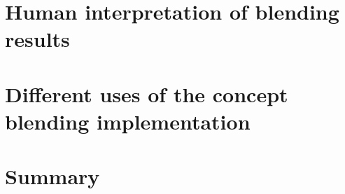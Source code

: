 



\section{Human interpretation of blending results}


\section{Different uses of the concept blending implementation}




\section{Summary}

